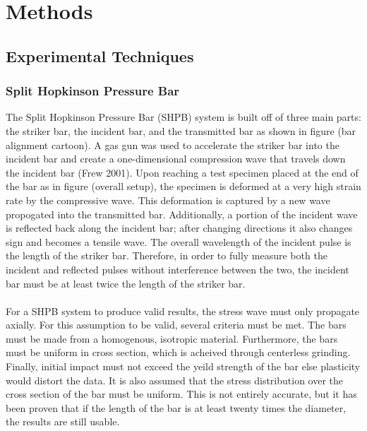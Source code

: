 \documentclass[12pt]{article}
\begin{document}
\section{Methods}

\subsection{Experimental Techniques} 

\subsubsection {Split Hopkinson Pressure Bar} %
The Split Hopkinson Pressure Bar (SHPB) system is built off of three main parts: the striker bar, the incident bar, and the transmitted bar as shown in figure (bar alignment cartoon). A gas gun was used to accelerate the striker bar into the incident bar and create a one-dimensional compression wave that travels down the incident bar (Frew 2001). Upon reaching a test specimen placed at the end of the bar as in figure (overall setup), the specimen is deformed at a very high strain rate by the compressive wave. This deformation is captured by a new wave propogated into the transmitted bar. Additionally, a portion of the incident wave is reflected back along the incident bar; after changing directions it also changes sign and becomes a tensile wave. The overall wavelength of the incident pulse is the length of the striker bar. Therefore, in order to fully measure both the incident and reflected pulses without interference between the two, the incident bar must be at least twice the length of the striker bar.
\\ \\
For a SHPB system to produce valid results, the stress wave must only propagate axially. For this assumption to be valid, several criteria must be met. The bars must be made from a homogenous, isotropic material. Furthermore, the bars must be uniform in cross section, which is acheived through centerless grinding. Finally, initial impact must not exceed the yeild strength of the bar else plasticity would distort the data. It is also assumed that the stress distribution over the cross section of the bar must be uniform. This is not entirely accurate, but it has been proven that if the length of the bar is at least twenty times the diameter, the results are still usable. 
\\ \\
\end{document}
